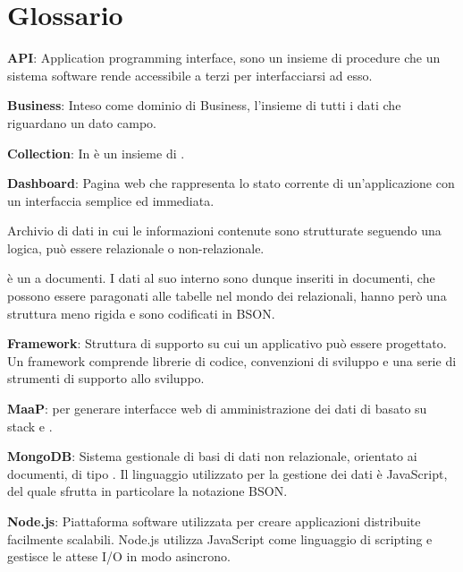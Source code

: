 \section{Glossario}


\textbf{API}: Application programming interface, sono un insieme di procedure che un sistema software rende accessibile a terzi per interfacciarsi ad esso.


\textbf{Business}: 
Inteso come dominio di Business, l'insieme di tutti i dati che riguardano un dato campo.


\textbf{Collection}: 
In  è un insieme di .


\textbf{Dashboard}: Pagina web che rappresenta lo stato corrente di un'applicazione con un interfaccia semplice ed immediata.

Archivio di dati in cui le informazioni contenute sono strutturate seguendo una logica, può essere relazionale o non-relazionale.

 è un  a documenti. I dati al suo interno sono dunque inseriti in documenti, che possono essere paragonati alle tabelle nel mondo dei  relazionali, hanno però una struttura meno rigida e sono codificati in BSON.


\textbf{Framework}:
Struttura di supporto su cui un applicativo può essere progettato.
Un framework comprende librerie di codice, convenzioni di sviluppo e una serie di strumenti di supporto allo sviluppo.


\textbf{MaaP}:
 per generare interfacce web di amministrazione dei dati di  basato su stack  e .

\textbf{MongoDB}: Sistema gestionale di basi di dati non relazionale, orientato ai documenti, di tipo . Il linguaggio utilizzato per la gestione dei dati è JavaScript, del quale sfrutta in particolare la notazione BSON.


\textbf{Node.js}:
Piattaforma software utilizzata per creare applicazioni distribuite facilmente scalabili.
Node.js utilizza JavaScript come linguaggio di scripting e gestisce le attese I/O in modo asincrono.

